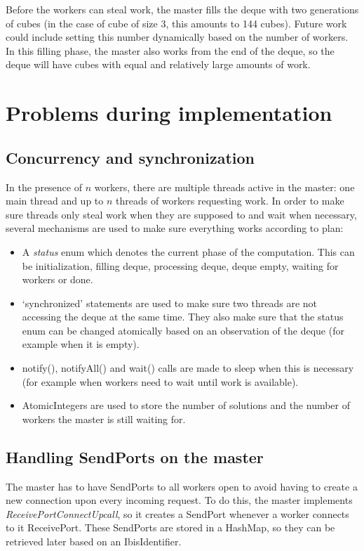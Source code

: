 \documentclass[11pt,a4paper]{article}
\begin{document}
Before the workers can steal work, the master fills the deque with two generations of cubes (in the case of cube of size 3, this amounts to 144 cubes). Future work could include setting this number dynamically based on the number of workers. In this filling phase, the master also works from the end of the deque, so the deque will have cubes with equal and relatively large amounts of work.

\section{Problems during implementation}

\subsection{Concurrency and synchronization}
In the presence of $n$ workers, there are multiple threads active in the master: one main thread and up to $n$ threads of workers requesting work. In order to make sure threads only steal work when they are supposed to and wait when necessary, several mechanisms are used to make sure everything works according to plan:
\begin{itemize}
\item A \emph{status} enum which denotes the current phase of the computation. This can be initialization, filling deque, processing deque, deque empty, waiting for workers or done.
\item `synchronized' statements are used to make sure two threads are not accessing the deque at the same time. They also make sure that the status enum can be changed atomically based on an observation of the deque (for example when it is empty).
\item notify(), notifyAll() and wait() calls are made to sleep when this is necessary (for example when workers need to wait until work is available).
\item AtomicIntegers are used to store the number of solutions and the number of workers the master is still waiting for.
\end{itemize}

\subsection{Handling SendPorts on the master}
The master has to have SendPorts to all workers open to avoid having to create a new connection upon every incoming request. To do this, the master implements \emph{ReceivePortConnectUpcall}, so it creates a SendPort whenever a worker connects to it ReceivePort. These SendPorts are stored in a HashMap, so they can be retrieved later based on an IbisIdentifier.
\end{document}
